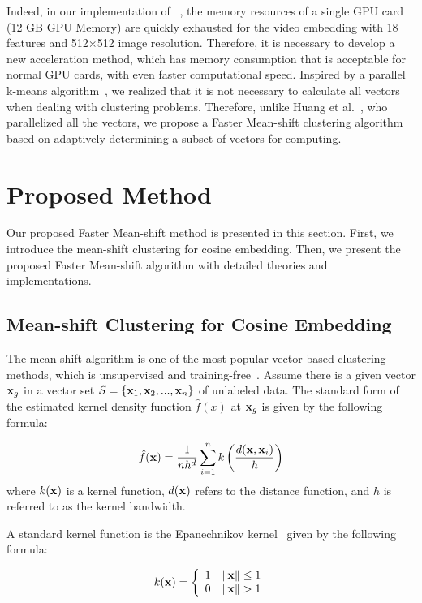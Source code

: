 \documentclass[journal,twoside,web]{ieeecolor}
\begin{document}
Indeed, in our implementation of  ~\cite{b18}, the memory resources of a single GPU card (12 GB GPU Memory) are quickly exhausted for the video embedding with 18 features and 512$\times$512 image resolution. Therefore, it is necessary to develop a new acceleration method, which has memory consumption that is acceptable for normal GPU cards, with even faster computational speed. Inspired by a parallel k-means algorithm~\cite{b37}, we realized that it is not necessary to calculate all vectors when dealing with clustering problems. Therefore, unlike Huang et al.~\cite{b18}, who parallelized all the vectors, we propose a Faster Mean-shift clustering algorithm based on adaptively determining a subset of vectors for computing.

\section{Proposed Method}
Our proposed Faster Mean-shift method is presented in this section. First, we introduce the mean-shift clustering for cosine embedding. Then, we present the proposed Faster Mean-shift algorithm with detailed theories and implementations.

\subsection{Mean-shift Clustering for Cosine Embedding}
The mean-shift algorithm is one of the most popular vector-based clustering methods, which is unsupervised and training-free~\cite{b29}. Assume there is a given vector ${{\bf{x}}_g}$ in a vector set $S = \{ {{\bf{x}}_1},{{\bf{x}}_2},...,{{\bf{x}}_n}\} $ of unlabeled data. The standard form of the estimated kernel density function $\hat f(x)$ at ${{\bf{x}}_g}$ is given by the following formula:

\begin{equation}
\hat f({\bf{x}}) = \frac{1}{{n{h^d}}}\sum\limits_{i = 1}^n k \left( {\frac{{d({{\bf{x}}},{{\bf{x}}_i})}}{h}} \right)
\label{eq2}\end{equation}where $k({\bf{x}})$ is a kernel function, $d({\bf{x}})$ refers to the distance function, and $h$ is referred to as the kernel bandwidth.

A standard kernel function is the Epanechnikov kernel~\cite{b30} given by the following formula:

\begin{equation}
k({\bf{x}}) = \left\{ {\begin{array}{*{20}{c}}
1&{\left\| {\bf{x}} \right\| \le 1}\\
0&{\left\| {\bf{x}} \right\| > 1}
\end{array}} \right.
\label{eq3}\end{equation} 
\end{document}
